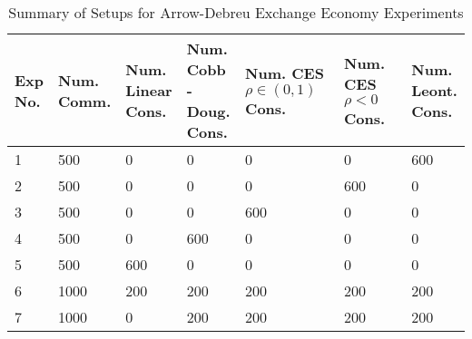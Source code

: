 \begin{wraptable}{R}{0.70\textwidth}
\begin{minipage}{0.70\textwidth}
   \footnotesize
   \begin{table}[H]
   \caption{Summary of Setups for Arrow-Debreu Exchange Economy Experiments}\label{table:exp_summary}
   \begin{center}
    \begin{tabular}{p{1cm} | p{1.2cm} p{1.2cm} p{1.2cm} p{1.5cm} p{1.5cm} p{1.2cm}}
    \hline
    \makecell{Exp \\ No.} & 
    \makecell{Num. \\ Comm.} & 
    \makecell{Num. \\ Linear \\ Cons.} & 
    \makecell{Num. \\ Cobb\\-Doug. \\ Cons.} & 
    \makecell{Num. \\  CES \\ $\rho \! \in \! \!(\!0, 1\!)$  \\ Cons.} & 
    \makecell{Num. \\  CES \\ $\rho <  0$ \\ Cons.} & 
    \makecell{Num. \\ Leont. \\ Cons.} \\ \hline \hline
    1 & 500 & 0 & 0 & 0 & 0 & 600 \\
    2 & 500 & 0 & 0 & 0 & 600 & 0\\
    3 & 500 & 0 & 0 & 600 & 0 & 0\\
    4 & 500 & 0 & 600 & 0 & 0 & 0\\
    5 & 500 & 600 & 0 & 0 & 0 & 0\\
    6 & 1000 & 200 & 200 & 200 & 200 & 200\\
    7 & 1000 & 0 & 200 & 200 & 200 & 200\\ \hline
    \end{tabular}
   \end{center}
\end{table}
\end{minipage}
\end{wraptable}
